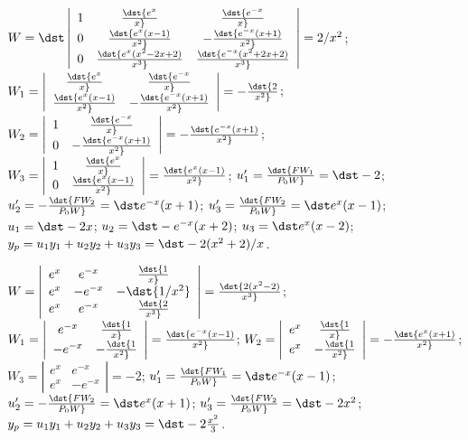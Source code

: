 \documentclass[dvips]{book}
\renewcommand{\exer}[1]{\par\medskip\;\noindent{\color{red}\bf #1.}}
\numberwithin{example}{section}
\numberwithin{equation}{section}
\numberwithin{theorem}{section}
\numberwithin{table}{section}
\numberwithin{figure}{section}
\begin{document}
\exer{9.4.4}
$W=\dst\left|\begin{array}{cccc}
1&\dst{e^x\over x}&\dst{e^{-x}\over x}\\
0&\dst{e^x(x-1)\over x^2}&-\dst{e^{-x}(x+1)\over x^2}\\
0&\dst{e^x(x^2-2x+2)\over x^3}&\dst{e^{-x}(x^2+2x+2)\over x^3}
\end{array}\right|=2/x^2$;
$W_1=\left|\begin{array}{cccc}
\dst{e^x\over x}&\dst{e^{-x}\over x}
\\\dst{e^x(x-1)\over x^2}&-\dst{e^{-x}(x+1)\over x^2}
\end{array}\right|=-\dst{2\over x^2}$;
$W_2=
\left|\begin{array}{cccc}1&\dst{e^{-x}\over x}\\
0&-\dst{e^{-x}(x+1)\over x^2}
\end{array}\right|=-\dst{e^{-x}(x+1)\over x^2}$;
$W_3=\left|\begin{array}{cccc}
1&\dst{e^x\over x}\\
0&\dst{e^x(x-1)\over x^2}
\end{array}\right|=\dst{e^x(x-1)\over x^2}$;
$u_1'=\dst{FW_1\over P_0W}=\dst -2$;
$u_2'=-\dst{FW_2\over P_0W}=\dst e^{-x}(x+1)$;
$u_3'=\dst{FW_2\over P_0W}=\dst e^x(x-1)$;
$u_1=\dst -2x$;
$u_2=\dst -e^{-x}(x+2)$;
$u_3=\dst e^x(x-2)$;
$y_p=u_1y_1+u_2y_2+u_3y_3=\dst -2(x^2+2)/x$.



\exer{9.4.6}
$W=\left|\begin{array}{cccc}
e^x&e^{-x}&\dst{1\over x}\\
e^x&-e^{-x}&-\dst{1/x^2}\\e^x&e^{-x}&\dst{2\over x^3}
\end{array}\right|=\dst{2(x^2-2)\over x^3}$;
$W_1=\left|\begin{array}{cccc}
e^{-x}&\dst{1\over x}\\-e^{-x}&-\dst{1\over x^2}
\end{array}\right|=\dst{e^{-x}(x-1)\over x^2}$;
$W_2=\left|\begin{array}{cccc}
e^x&\dst{1\over x}\\e^x&-\dst{1\over x^2}
\end{array}\right|=-\dst{e^x(x+1)\over x^2}$;
$W_3=\left|\begin{array}{cccc}
e^x&e^{-x}\\e^x&-e^{-x}
\end{array}\right|=-2$;
$u_1'=\dst{FW_1\over P_0W}=\dst e^{-x}(x-1)$;
$u_2'=-\dst{FW_2\over P_0W}=\dst e^x(x+1)$;
$u_3'=\dst{FW_2\over P_0W}=\dst -2x^2$;
$y_p=u_1y_1+u_2y_2+u_3y_3=\dst-2{x^2\over3}$.
\end{document}
